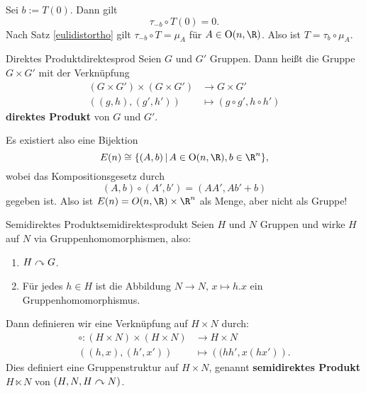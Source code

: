 \begin{beweis}
Sei $b:=T(0)$. Dann gilt
\begin{equation}
\tau_{-b}\circ T(0) = 0.
\end{equation}
Nach Satz \ref{eulidistortho} gilt $\tau_{-b} \circ T = \mu_A$ für $A \in \text{O}(n,\R)$. Also ist $T = \tau_b \circ \mu_A$.
\end{beweis}
\begin{definition}{Direktes Produkt}{direktesprod}
Seien $G$ und $G'$ Gruppen. Dann heißt die Gruppe $G \times G'$ mit der Verknüpfung
\begin{equation}
\begin{split}
(G \times G') \times (G \times G') &\to G \times G'\\
((g,h), (g',h')) &\mapsto (g\circ g', h \circ h')
\end{split}
\end{equation}
\textbf{direktes Produkt} von $G$ und $G'$.
\end{definition}
\begin{bemerkung}
Es existiert also eine Bijektion
\begin{equation}
E(n) \cong \{(A,b) \, | \, A \in \text{O}(n, \R), b \in \R^n\},
\end{equation}
wobei das Kompositionsgesetz durch
\begin{equation}
(A,b) \circ (A', b') = (AA', Ab'+b)
\end{equation}
gegeben ist. Also ist $E(n) = O(n, \R) \times \R^n$ als Menge, aber nicht als Gruppe!
\end{bemerkung}
\begin{definition}{Semidirektes Produkt}{semidirektesprodukt}
Seien $H$ und $N$ Gruppen und wirke $H$ auf $N$ via Gruppenhomomorphismen, also:
\begin{enumerate}
\item $H \curvearrowright G$.
\item Für jedes $h \in H$ ist die Abbildung $N \to N, \, x \mapsto h.x$ ein Gruppenhomomorphismus.
\end{enumerate}
Dann definieren wir eine Verknüpfung auf $H \times N$ durch:
\begin{equation}
\begin{split}
\circ: (H \times N) \times (H \times N) &\to H \times N\\
\left( (h,x) , (h', x')\right) &\mapsto \left( (hh', x(hx') \right).
\end{split}
\end{equation}
Dies definiert eine Gruppenstruktur auf $H \times N$, genannt \textbf{semidirektes Produkt} $H \ltimes N$ von $(H,N, H\curvearrowright N)$.
\end{definition}
